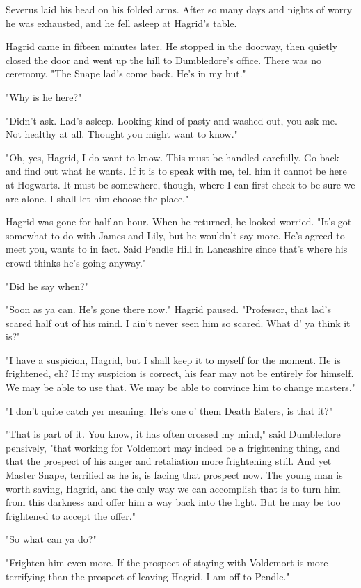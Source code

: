 Severus laid his head on his folded arms. After so many days and nights of worry he was exhausted, and he fell asleep at Hagrid's table.

Hagrid came in fifteen minutes later. He stopped in the doorway, then quietly closed the door and went up the hill to Dumbledore's office. There was no ceremony. "The Snape lad's come back. He's in my hut."

"Why is he here?"

"Didn't ask. Lad's asleep. Looking kind of pasty and washed out, you ask me. Not healthy at all. Thought you might want to know."

"Oh, yes, Hagrid, I do want to know. This must be handled carefully. Go back and find out what he wants. If it is to speak with me, tell him it cannot be here at Hogwarts. It must be somewhere, though, where I can first check to be sure we are alone. I shall let him choose the place."

Hagrid was gone for half an hour. When he returned, he looked worried. "It's got somewhat to do with James and Lily, but he wouldn't say more. He's agreed to meet you, wants to in fact. Said Pendle Hill in Lancashire since that's where his crowd thinks he's going anyway."

"Did he say when?"

"Soon as ya can. He's gone there now." Hagrid paused. "Professor, that lad's scared half out of his mind. I ain't never seen him so scared. What d' ya think it is?"

"I have a suspicion, Hagrid, but I shall keep it to myself for the moment. He is frightened, eh? If my suspicion is correct, his fear may not be entirely for himself. We may be able to use that. We may be able to convince him to change masters."

"I don't quite catch yer meaning. He's one o' them Death Eaters, is that it?"

"That is part of it. You know, it has often crossed my mind," said Dumbledore pensively, "that working for Voldemort may indeed be a frightening thing, and that the prospect of his anger and retaliation more frightening still. And yet Master Snape, terrified as he is, is facing that prospect now. The young man is worth saving, Hagrid, and the only way we can accomplish that is to turn him from this darkness and offer him a way back into the light. But he may be too frightened to accept the offer."

"So what can ya do?"

"Frighten him even more. If the prospect of staying with Voldemort is more terrifying than the prospect of leaving{\el} Hagrid, I am off to Pendle."

